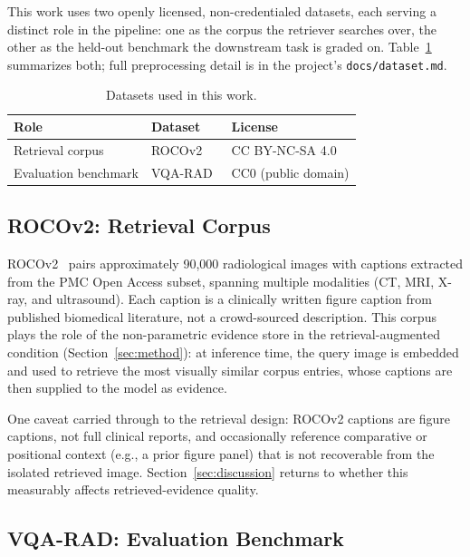 This work uses two openly licensed, non-credentialed datasets, each serving
a distinct role in the pipeline: one as the corpus the retriever searches
over, the other as the held-out benchmark the downstream task is graded on.
Table~\ref{tab:datasets} summarizes both; full preprocessing detail is in
the project's \texttt{docs/dataset.md}.

\begin{table}[t]
\centering
\caption{Datasets used in this work.}
\label{tab:datasets}
\begin{tabular}{@{}lll@{}}
\toprule
Role & Dataset & License \\
\midrule
Retrieval corpus & ROCOv2~\cite{ruckert2024rocov2} & CC BY-NC-SA 4.0 \\
Evaluation benchmark & VQA-RAD~\cite{lau2018vqarad} & CC0 (public domain) \\
\bottomrule
\end{tabular}
\end{table}

\subsection{ROCOv2: Retrieval Corpus}

ROCOv2~\cite{ruckert2024rocov2} pairs approximately 90{,}000 radiological
images with captions extracted from the PMC Open Access subset, spanning
multiple modalities (CT, MRI, X-ray, and ultrasound). Each caption is a
clinically written figure caption from published biomedical literature,
not a crowd-sourced description. This corpus plays the role of the
non-parametric evidence store in the retrieval-augmented condition
(Section~\ref{sec:method}): at inference time, the query image is embedded
and used to retrieve the most visually similar corpus entries, whose
captions are then supplied to the model as evidence.

One caveat carried through to the retrieval design: ROCOv2 captions are
figure captions, not full clinical reports, and occasionally reference
comparative or positional context (e.g., a prior figure panel) that is not
recoverable from the isolated retrieved image. Section~\ref{sec:discussion}
returns to whether this measurably affects retrieved-evidence quality.

\subsection{VQA-RAD: Evaluation Benchmark}

